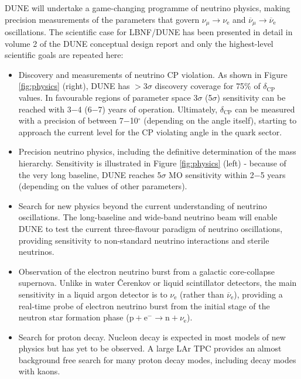  
DUNE will undertake a game-changing programme of neutrino physics, making precision measurements of the parameters that govern $\nu_{\mu} \rightarrow \nu_\text{e}$ and $\overline{\nu}_{\mu} \rightarrow \overline{\nu}_\text{e}$ oscillations. The scientific case for LBNF/DUNE has been presented in detail in volume 2 of the DUNE conceptual design report\cite{2015arXiv151206148D} and only the highest-level scientific goals are repeated here:
\begin{itemize}
\item 
Discovery and measurements of neutrino CP violation. As shown in Figure \ref{fig:physics} (right), DUNE has $>$3$\sigma$ discovery coverage for 75\% of $\delta_\text{CP}$ values. In favourable regions of parameter space 3$\sigma$ (5$\sigma$) sensitivity can be reached with 3$-$4 (6$-$7) years of operation. Ultimately, $\delta_\text{CP}$ can be measured with a precision of between 7$-$10$^\circ$ (depending on the angle itself), starting to approach the current level for the CP violating angle in the quark sector.   
\item  
Precision neutrino physics, including the definitive determination of the mass hierarchy. Sensitivity is illustrated in Figure \ref{fig:physics} (left) - because of the very long baseline, DUNE reaches 5$\sigma$ MO sensitivity within 2$-$5 years 
(depending on the values of other parameters).	
\item
Search for new physics beyond the current understanding of neutrino oscillations. The long-baseline and wide-band neutrino beam will enable DUNE to test the current three-flavour paradigm of neutrino oscillations, providing sensitivity to non-standard neutrino interactions and sterile neutrinos. 
\item 
Observation of the electron neutrino burst from a galactic core-collapse supernova. Unlike in water \v{C}erenkov or liquid scintillator detectors, the main sensitivity in a liquid argon detector is to $\nu_\text{e}$ (rather than $\overline{\nu}_\text{e}$), providing a real-time probe of electron neutrino burst from the initial stage of the neutron star formation phase ($\text{p} + \text{e}^- \rightarrow \text{n} + \nu_\text{e}$). 
\item 
Search for proton decay. Nucleon decay is expected in most models of new physics but has yet to be observed. A large LAr TPC provides an almost background free search for many proton decay modes, including decay modes with kaons.
\end{itemize} 

